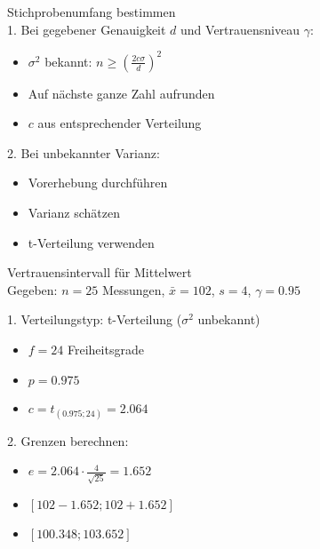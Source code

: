 \begin{KR}{Stichprobenumfang bestimmen}\\
1. Bei gegebener Genauigkeit $d$ und Vertrauensniveau $\gamma$:
   \begin{itemize}
     \item $\sigma^2$ bekannt: $n \geq (\frac{2c\sigma}{d})^2$
     \item Auf nächste ganze Zahl aufrunden
     \item $c$ aus entsprechender Verteilung
   \end{itemize}

2. Bei unbekannter Varianz:
   \begin{itemize}
     \item Vorerhebung durchführen
     \item Varianz schätzen
     \item t-Verteilung verwenden
   \end{itemize}
\end{KR}

\begin{example2}{Vertrauensintervall für Mittelwert}\\
Gegeben: $n=25$ Messungen, $\bar{x}=102$, $s=4$, $\gamma=0.95$

1. Verteilungstyp: t-Verteilung ($\sigma^2$ unbekannt)
   \begin{itemize}
     \item $f=24$ Freiheitsgrade
     \item $p=0.975$
     \item $c=t_{(0.975;24)}=2.064$
   \end{itemize}

2. Grenzen berechnen:
   \begin{itemize}
     \item $e=2.064 \cdot \frac{4}{\sqrt{25}}=1.652$
     \item $[102-1.652; 102+1.652]$
     \item $[100.348; 103.652]$
   \end{itemize}
\end{example2}